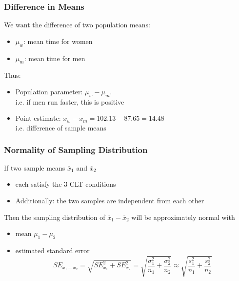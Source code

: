\documentclass[handout]{beamer}
\newcommand{\blue}[1]{\textcolor{blue2}{#1}}
\newcommand{\xbar}{\overline{x}}
\begin{document}


\begin{frame}[fragile]
\frametitle{Difference in Means}
%
%
We want the difference of two population means:
\pause\begin{itemize}
\item $\mu_w$: mean time for women
\item $\mu_m$: mean time for men
\end{itemize}

Thus:
\begin{itemize}
\pause\item Population parameter:  $\mu_w - \mu_m$.\\
i.e. if men run faster, this is positive
\pause\item Point estimate:  $\xbar_w - \xbar_m = 102.13-87.65=14.48$\\
i.e. \blue{difference of sample means}
\end{itemize}
\end{frame}


\begin{frame}[fragile]
\frametitle{Normality of Sampling Distribution}
%
%
If two sample means $\xbar_1$ and $\xbar_2$ 
\begin{itemize}
\pause\item each satisfy the 3 CLT conditions
\pause\item Additionally: the \blue{two samples are independent from each other}
\end{itemize}

\vspace{0.25cm}

\pause Then the sampling distribution of $\xbar_1 - \xbar_2$ will be approximately normal with
\begin{itemize}
\pause\item mean $\mu_1-\mu_2$
\pause\item estimated standard error
\[
SE_{\xbar_1 - \xbar_2} = \sqrt{SE_{\xbar_1}^2 + SE_{\xbar_2}^2} = \sqrt{\frac{\sigma_1^2}{n_1} + \frac{\sigma_2^2}{n_2}} \approx \sqrt{\frac{s_1^2}{n_1} + \frac{s_2^2}{n_2}}
\]
\end{itemize}
\end{frame}
\end{document}
